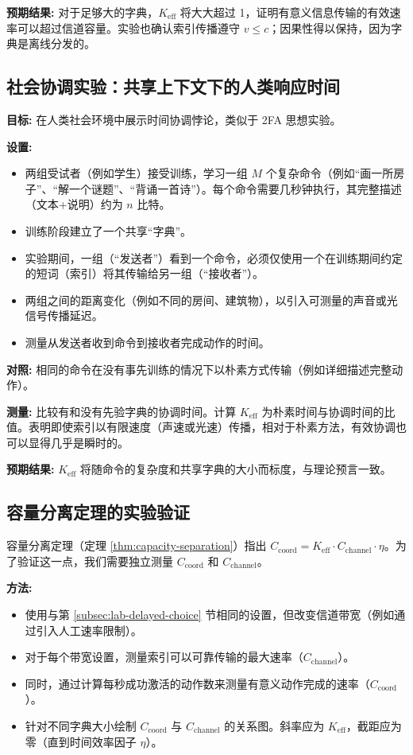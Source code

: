 \documentclass[12pt]{article}
\begin{document}
	\textbf{预期结果:} 对于足够大的字典，\(K_{\mathrm{eff}}\) 将大大超过 1，证明有意义信息传输的有效速率可以超过信道容量。实验也确认索引传播遵守 \(v \le c\)；因果性得以保持，因为字典是离线分发的。
	
	\subsection{社会协调实验：共享上下文下的人类响应时间}
	\label{subsec:social-experiment}
	
	\textbf{目标:} 在人类社会环境中展示时间协调悖论，类似于 2FA 思想实验。
	
	\textbf{设置:}
	\begin{itemize}
		\item 两组受试者（例如学生）接受训练，学习一组 \(M\) 个复杂命令（例如“画一所房子”、“解一个谜题”、“背诵一首诗”）。每个命令需要几秒钟执行，其完整描述（文本+说明）约为 \(n\) 比特。
		\item 训练阶段建立了一个共享“字典”。
		\item 实验期间，一组（“发送者”）看到一个命令，必须仅使用一个在训练期间约定的短词（索引）将其传输给另一组（“接收者”）。
		\item 两组之间的距离变化（例如不同的房间、建筑物），以引入可测量的声音或光信号传播延迟。
		\item 测量从发送者收到命令到接收者完成动作的时间。
	\end{itemize}
	
	\textbf{对照:} 相同的命令在没有事先训练的情况下以朴素方式传输（例如详细描述完整动作）。
	
	\textbf{测量:} 比较有和没有先验字典的协调时间。计算 \(K_{\mathrm{eff}}\) 为朴素时间与协调时间的比值。表明即使索引以有限速度（声速或光速）传播，相对于朴素方法，有效协调也可以显得几乎是瞬时的。
	
	\textbf{预期结果:} \(K_{\mathrm{eff}}\) 将随命令的复杂度和共享字典的大小而标度，与理论预言一致。
	
	\subsection{容量分离定理的实验验证}
	\label{subsec:capacity-theorem}
	
	容量分离定理（定理 \ref{thm:capacity-separation}）指出 \(C_{\text{coord}} = K_{\mathrm{eff}} \cdot C_{\text{channel}} \cdot \eta\)。为了验证这一点，我们需要独立测量 \(C_{\text{coord}}\) 和 \(C_{\text{channel}}\)。
	
	\textbf{方法:}
	\begin{itemize}
		\item 使用与第 \ref{subsec:lab-delayed-choice} 节相同的设置，但改变信道带宽（例如通过引入人工速率限制）。
		\item 对于每个带宽设置，测量索引可以可靠传输的最大速率（\(C_{\text{channel}}\)）。
		\item 同时，通过计算每秒成功激活的动作数来测量有意义动作完成的速率（\(C_{\text{coord}}\)）。
		\item 针对不同字典大小绘制 \(C_{\text{coord}}\) 与 \(C_{\text{channel}}\) 的关系图。斜率应为 \(K_{\mathrm{eff}}\)，截距应为零（直到时间效率因子 \(\eta\)）。
	\end{itemize}
	
\end{document}
